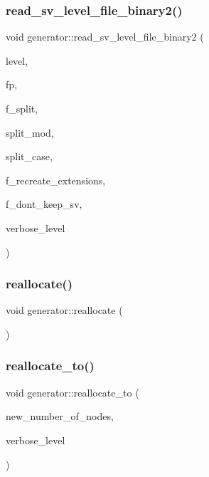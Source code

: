 \subsubsection{\texorpdfstring{read\+\_\+sv\+\_\+level\+\_\+file\+\_\+binary2()}{read\_sv\_level\_file\_binary2()}}
{\footnotesize\ttfamily void generator\+::read\+\_\+sv\+\_\+level\+\_\+file\+\_\+binary2 (\begin{DoxyParamCaption}\item[{\mbox{\hyperlink{galois_8h_a09fddde158a3a20bd2dcadb609de11dc}{I\+NT}}}]{level,  }\item[{F\+I\+LE $\ast$}]{fp,  }\item[{\mbox{\hyperlink{galois_8h_a09fddde158a3a20bd2dcadb609de11dc}{I\+NT}}}]{f\+\_\+split,  }\item[{\mbox{\hyperlink{galois_8h_a09fddde158a3a20bd2dcadb609de11dc}{I\+NT}}}]{split\+\_\+mod,  }\item[{\mbox{\hyperlink{galois_8h_a09fddde158a3a20bd2dcadb609de11dc}{I\+NT}}}]{split\+\_\+case,  }\item[{\mbox{\hyperlink{galois_8h_a09fddde158a3a20bd2dcadb609de11dc}{I\+NT}}}]{f\+\_\+recreate\+\_\+extensions,  }\item[{\mbox{\hyperlink{galois_8h_a09fddde158a3a20bd2dcadb609de11dc}{I\+NT}}}]{f\+\_\+dont\+\_\+keep\+\_\+sv,  }\item[{\mbox{\hyperlink{galois_8h_a09fddde158a3a20bd2dcadb609de11dc}{I\+NT}}}]{verbose\+\_\+level }\end{DoxyParamCaption})}

\mbox{\label{classgenerator_a810e247a13d8ddd672583e5d8fb9a89e}} 
\subsubsection{\texorpdfstring{reallocate()}{reallocate()}}
{\footnotesize\ttfamily void generator\+::reallocate (\begin{DoxyParamCaption}{ }\end{DoxyParamCaption})}

\mbox{\label{classgenerator_aaabd1655d088257996d3faf26dfd552c}} 
\subsubsection{\texorpdfstring{reallocate\+\_\+to()}{reallocate\_to()}}
{\footnotesize\ttfamily void generator\+::reallocate\+\_\+to (\begin{DoxyParamCaption}\item[{\mbox{\hyperlink{galois_8h_a09fddde158a3a20bd2dcadb609de11dc}{I\+NT}}}]{new\+\_\+number\+\_\+of\+\_\+nodes,  }\item[{\mbox{\hyperlink{galois_8h_a09fddde158a3a20bd2dcadb609de11dc}{I\+NT}}}]{verbose\+\_\+level }\end{DoxyParamCaption})}

